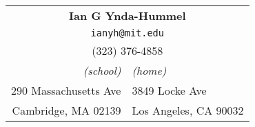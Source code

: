 \documentclass{article}
\begin{document}
\pagestyle{empty}

\pagestyle{empty}
\begin{center}
\begin{tabular}{r|l}
\multicolumn{2}{c}{\large\bf Ian G Ynda-Hummel}\\
\multicolumn{2}{c}{\tt ianyh@mit.edu}\\
\multicolumn{2}{c}{(323) 376-4858}\\
{\it (school)} & {\it (home)}\\
290 Massachusetts Ave & 3849 Locke Ave\\
Cambridge, MA 02139 & Los Angeles, CA 90032
\end{tabular}
\end{center}

\end{document}
